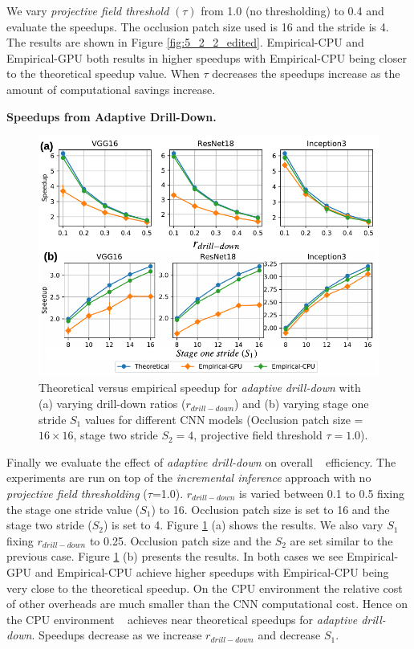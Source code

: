 We vary \textit{projective field threshold} $(\tau)$ from 1.0 (no thresholding) to 0.4 and evaluate the speedups.
The occlusion patch size used is 16 and the stride is 4.
The results are shown in Figure \ref{fig:5_2_2_edited}.
Empirical-CPU and Empirical-GPU both results in higher speedups with Empirical-CPU being closer to the theoretical speedup value.
When $\tau$ decreases the speedups increase as the amount of computational savings increase.

\vspace{2mm}
\noindent \textbf{Speedups from Adaptive Drill-Down.}

\begin{figure}[t]
\includegraphics[width=\columnwidth]{images/5_2_3_edited}
\caption{Theoretical versus empirical speedup for \textit{adaptive drill-down} with (a) varying drill-down ratios ($r_{drill-down}$) and (b) varying stage one stride $S_1$ values for different CNN models (Occlusion patch size = $16 \times 16$, stage two stride $S_2=4$, projective field threshold $\tau=1.0$).}
\label{fig:5_2_3_edited}
\end{figure}

Finally we evaluate the effect of \textit{adaptive drill-down} on overall \system~ efficiency.
The experiments are run on top of the \textit{incremental inference} approach with no \textit{projective field thresholding} ($\tau$=1.0).
$r_{drill-down}$ is varied between 0.1 to 0.5 fixing the stage one stride value ($S_1$) to 16.
Occlusion patch size is set to 16 and the stage two stride ($S_2$) is set to 4.
Figure \ref{fig:5_2_3_edited} (a) shows the results.
We also vary $S_1$ fixing $r_{drill-down}$ to 0.25.
Occlusion patch size and the $S_2$ are set similar to the previous case.
Figure \ref{fig:5_2_3_edited} (b) presents the results.
In both cases we see Empirical-GPU and Empirical-CPU achieve higher speedups with Empirical-CPU being very close to the theoretical speedup.
On the CPU environment the relative cost of other overheads are much smaller than the CNN computational cost.
Hence on the CPU environment \system~ achieves near theoretical speedups for \textit{adaptive drill-down}.
Speedups decrease as we increase $r_{drill-down}$ and decrease $S_1$.

